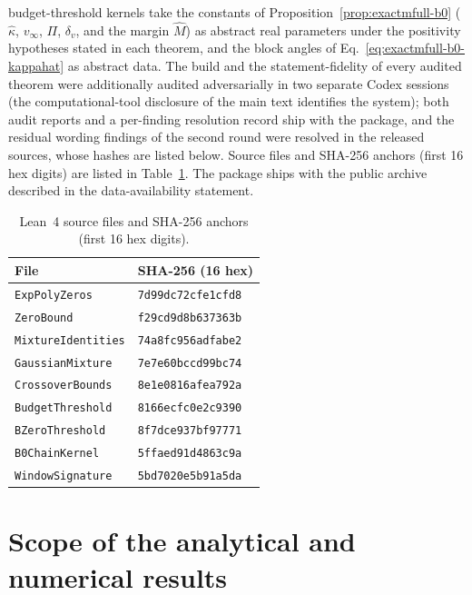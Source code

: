 \documentclass[aps,physrev,onecolumn,amsmath,amssymb,longbibliography]{revtex4-2}
\begin{document}
budget-threshold kernels take the constants of
Proposition~\ref{prop:exactmfull-b0} (\(\hat\kappa\), \(v_\infty\), \(\Pi\),
\(\delta_v\), and the margin \(\hat M\)) as abstract real parameters under
the positivity hypotheses stated in each theorem, and the block angles of
Eq.~\eqref{eq:exactmfull-b0-kappahat} as abstract data.  The build and the
statement-fidelity of every audited theorem were additionally audited
adversarially in two separate Codex sessions (the computational-tool
disclosure of the main text identifies the system); both audit reports and
a per-finding resolution record ship with the package, and the residual
wording findings of the second round were resolved in the released sources,
whose hashes are listed below.  Source files and SHA-256 anchors (first 16
hex digits) are listed in Table~\ref{tab:supp-lean-anchors}.  The package
ships with the public archive described in the data-availability statement.

\begin{table}[t]
\caption{Lean~4 source files and SHA-256 anchors (first 16 hex digits).
\label{tab:supp-lean-anchors}}
\begin{ruledtabular}
\begin{tabular}{ll}
File & SHA-256 (16 hex)\\
\hline
\texttt{ExpPolyZeros} & \texttt{7d99dc72cfe1cfd8}\\
\texttt{ZeroBound} & \texttt{f29cd9d8b637363b}\\
\texttt{MixtureIdentities} & \texttt{74a8fc956adfabe2}\\
\texttt{GaussianMixture} & \texttt{7e7e60bccd99bc74}\\
\texttt{CrossoverBounds} & \texttt{8e1e0816afea792a}\\
\texttt{BudgetThreshold} & \texttt{8166ecfc0e2c9390}\\
\texttt{BZeroThreshold} & \texttt{8f7dce937bf97771}\\
\texttt{B0ChainKernel} & \texttt{5ffaed91d4863c9a}\\
\texttt{WindowSignature} & \texttt{5bd7020e5b91a5da}\\
\end{tabular}
\end{ruledtabular}
\end{table}

\section{Scope of the analytical and numerical results}
\label{sec:supp-scope}
\end{document}
